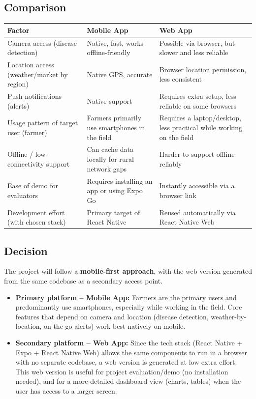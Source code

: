 \documentclass[12pt,a4paper]{article}
\begin{document}
\subsection{Comparison}
\begin{longtable}{p{3.2cm} p{5.7cm} p{5.1cm}}
\toprule
\textbf{Factor} & \textbf{Mobile App} & \textbf{Web App} \\
\midrule
\endhead
Camera access (disease detection) & Native, fast, works offline-friendly & Possible via browser, but slower and less reliable \\
Location access (weather/market by region) & Native GPS, accurate & Browser location permission, less consistent \\
Push notifications (alerts) & Native support & Requires extra setup, less reliable on some browsers \\
Usage pattern of target user (farmer) & Farmers primarily use smartphones in the field & Requires a laptop/desktop, less practical while working on the field \\
Offline / low-connectivity support & Can cache data locally for rural network gaps & Harder to support offline reliably \\
Ease of demo for evaluators & Requires installing an app or using Expo Go & Instantly accessible via a browser link \\
Development effort (with chosen stack) & Primary target of React Native & Reused automatically via React Native Web \\
\bottomrule
\end{longtable}

\subsection{Decision}
The project will follow a \textbf{mobile-first approach}, with the web version generated from the same codebase as a secondary access point.

\begin{itemize}[leftmargin=*]
    \item \textbf{Primary platform -- Mobile App:} Farmers are the primary users and predominantly use smartphones, especially while working in the field. Core features that depend on camera and location (disease detection, weather-by-location, on-the-go alerts) work best natively on mobile.
    \item \textbf{Secondary platform -- Web App:} Since the tech stack (React Native + Expo + React Native Web) allows the same components to run in a browser with no separate codebase, a web version is generated at low extra effort. This web version is useful for project evaluation/demo (no installation needed), and for a more detailed dashboard view (charts, tables) when the user has access to a larger screen.
\end{itemize}
\end{document}
